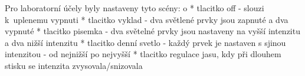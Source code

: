 \medskip
\noindent
{\sbf Pro laboratorní účely byly nastaveny tyto scény:}
\begitems \style o
* tlacitko off - slouzi k~uplenemu vypnuti
* tlacitko vyklad - dva světlené prvky jsou zapnuté a dva vypnuté
* tlacitko pisemka - dva světelné prvky jsou nastaveny na vyšší intenzitu a dva nižší intenzitu
* tlacitko denní svetlo - každý prvek je nastaven s sjinou intenzitou - od nejnižší po nejvyšší
* tlacitko regulace jasu, kdy při dlouhem stisku se intenzita zvysovala/snizovala
\enditems









